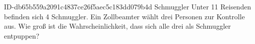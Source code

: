 \begin{exercise}
      {ID-db65b559a2091c4837ce26f5aec5c183dd079b4d}
      {Schmuggler}
  \ifproblem\problem
    Unter 11 Reisenden befinden sich 4 Schmuggler. Ein Zollbeamter wählt drei
    Personen zur Kontrolle aus. Wie groß ist die Wahrscheinlichkeit, dass sich
    alle drei als Schmuggler entpuppen?
  \fi
\end{exercise}
